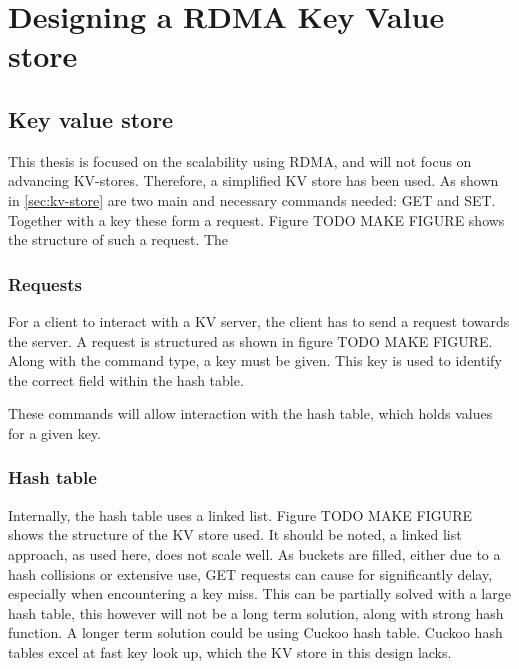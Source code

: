 
\chapter{Designing a RDMA Key Value store}\label{ch:design} %



\ifpdf
    \graphicspath{{7/figures/PNG/}{7/figures/PDF/}{7/figures/}}
\else
    \graphicspath{{7/figures/EPS/}{7/figures/}}
\fi



\section{Key value store}
This thesis is focused on the scalability using RDMA, and will not focus on advancing KV-stores.
Therefore, a simplified KV store has been used.
As shown in \ref{sec:kv-store} are two main and necessary commands needed: GET and SET.
Together with a key these form a request.
Figure TODO MAKE FIGURE shows the structure of such a request.
The
\subsection{Requests}
For a client to interact with a KV server, the client has to send a request towards the server.
A request is structured as shown in figure TODO MAKE FIGURE.
Along with the command type, a key must be given.
This key is used to identify the correct field within the hash table.



These commands will allow interaction with the hash table, which holds values for a given key.

\subsection{Hash table}
Internally, the hash table uses a linked list.
Figure TODO MAKE FIGURE shows the structure of the KV store used.
It should be noted, a linked list approach, as used here, does not scale well.
As buckets are filled, either due to a hash collisions or extensive use, GET requests can cause for significantly delay, especially when encountering a key miss.
This can be partially solved with a large hash table, this however will not be a long term solution, along with strong hash function.
A longer term solution could be using Cuckoo hash table\cite{pagh2004cuckoo}.
Cuckoo hash tables excel at fast key look up, which the KV store in this design lacks.




